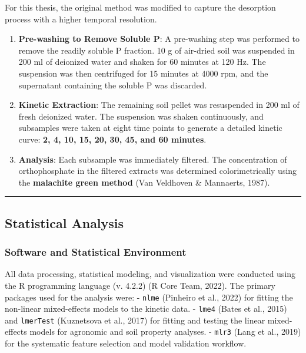 \documentclass[
  a4paper,
]{article}
\begin{document}
For this thesis, the original method was modified to capture the
desorption process with a higher temporal resolution.

\begin{enumerate}
\def\labelenumi{\arabic{enumi}.}
\item
  \textbf{Pre-washing to Remove Soluble P}: A pre-washing step was
  performed to remove the readily soluble P fraction. 10 g of air-dried
  soil was suspended in 200 ml of deionized water and shaken for 60
  minutes at 120 Hz. The suspension was then centrifuged for 15 minutes
  at 4000 rpm, and the supernatant containing the soluble P was
  discarded.
\item
  \textbf{Kinetic Extraction}: The remaining soil pellet was resuspended
  in 200 ml of fresh deionized water. The suspension was shaken
  continuously, and subsamples were taken at eight time points to
  generate a detailed kinetic curve: \textbf{2, 4, 10, 15, 20, 30, 45,
  and 60 minutes}.
\item
  \textbf{Analysis}: Each subsample was immediately filtered. The
  concentration of orthophosphate in the filtered extracts was
  determined colorimetrically using the \textbf{malachite green method}
  (Van Veldhoven \& Mannaerts, 1987).
\end{enumerate}

\begin{center}\rule{0.5\linewidth}{0.5pt}\end{center}

\subsection{Statistical Analysis}\label{sec-statistical-analysis}

\subsubsection{Software and Statistical
Environment}\label{software-and-statistical-environment}

All data processing, statistical modeling, and visualization were
conducted using the R programming language (v. 4.2.2) (R Core Team,
2022). The primary packages used for the analysis were: - \texttt{nlme}
(Pinheiro et al., 2022) for fitting the non-linear mixed-effects models
to the kinetic data. - \texttt{lme4} (Bates et al., 2015) and
\texttt{lmerTest} (Kuznetsova et al., 2017) for fitting and testing the
linear mixed-effects models for agronomic and soil property analyses. -
\texttt{mlr3} (Lang et al., 2019) for the systematic feature selection
and model validation workflow.
\end{document}
